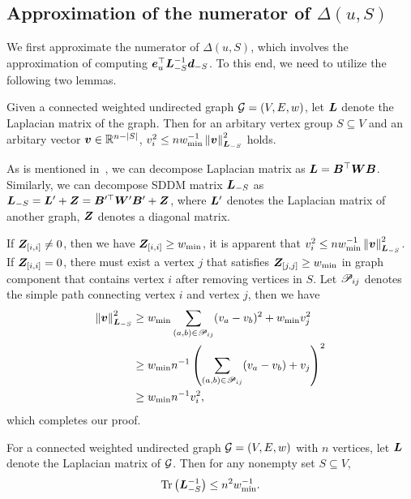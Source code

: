 \documentclass[10pt,twocolumn,twoside]{IEEEtran}
\begin{document}
\subsection{Approximation of the numerator of \(\Delta(u,S)\)}

We first approximate the numerator of \(\Delta(u,S)\), which involves the approximation of computing \(\boldsymbol{e}_u^\top\boldsymbol{L}_{-S}^{-1}\boldsymbol{d}_{-S}\).
To this end, we need to utilize the following two lemmas.

\begin{lemma}\label{lem:norm-ineq}
    Given a connected weighted undirected graph \(\mathcal{G}=(V,E,w)\), let \(\boldsymbol{L}\) denote the Laplacian matrix of the graph.
    Then for an arbitary vertex group \(S\subseteq V\) and an arbitary vector \(\boldsymbol{v}\in\mathbb{R}^{n-\left|S \right|}\), \(v_i^2\le nw_{\min}^{-1}\left\Vert\boldsymbol{v}\right\Vert^2_{\boldsymbol{L}_{-S}}\) holds.
\end{lemma}

\begin{IEEEproof}
    As is mentioned in~, we can decompose Laplacian matrix as \(\boldsymbol{L}=\boldsymbol{B}^\top\boldsymbol{W}\boldsymbol{B}\).
    Similarly, we can decompose SDDM matrix \(\boldsymbol{L}_{-S}\) as \(\boldsymbol{L}_{-S}=\boldsymbol{L}'+\boldsymbol{Z}=\boldsymbol{B}'^\top\boldsymbol{W}'\boldsymbol{B}'+\boldsymbol{Z}\), where \(\boldsymbol{L}'\) denotes the Laplacian matrix of another graph, \(\boldsymbol{Z}\) denotes a diagonal matrix.

    If \(\boldsymbol{Z}_{[i,i]}\neq0\), then we have \(\boldsymbol{Z}_{[i,i]}\ge w_{\min}\), it is apparent that \(v_i^2\le nw_{\min}^{-1}\left\Vert\boldsymbol{v}\right\Vert^2_{\boldsymbol{L}_{-S}}\).
    If \(\boldsymbol{Z}_{[i,i]}=0\), there must exist a vertex \(j\) that satisfies \(\boldsymbol{Z}_{[j,j]}\ge w_{\min}\) in graph component that contains vertex \(i\) after removing vertices in \(S\).
    Let \(\mathscr{P}_{ij}\) denotes the simple path connecting vertex \(i\) and vertex \(j\), then we have
    \begin{align*}
        \left\Vert\boldsymbol{v}\right\Vert^2_{\boldsymbol{L}_{-S}}
         & \ge w_{\min}\sum_{\left( a,b \right)\in\mathscr{P}_{ij}}(v_a-v_b)^2+w_{\min}v_j^2     \\
         & \ge w_{\min}n^{-1}\left( \sum_{\left( a,b \right)\in\mathscr{P}_{ij}}(v_a-v_b)+v_j \right)^2 \\
         & \ge w_{\min}n^{-1}v_i^2,
    \end{align*}
    which completes our proof.
\end{IEEEproof}

\begin{lemma}\label{lem:trace-lap}
    For a connected weighted undirected graph \(\mathcal{G}=(V,E,w)\) with \(n\) vertices, let \(\boldsymbol{L}\) denote the Laplacian matrix of \(\mathcal{G}\).
    Then for any nonempty set \(S\subseteq V\),
    \begin{equation*}
        \mathrm{Tr}\left(\boldsymbol{L}_{-S}^{-1}\right)\le n^2w_{\min}^{-1}.
    \end{equation*}
\end{lemma}
\end{document}
